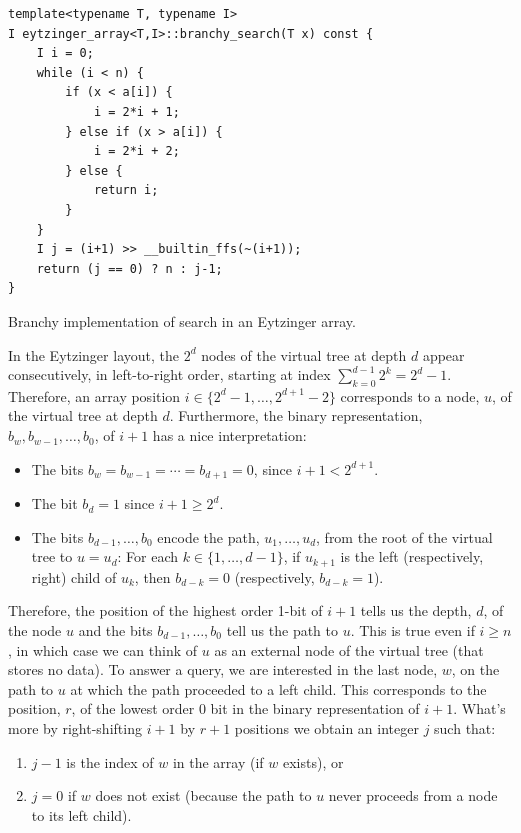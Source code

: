\documentclass{patmorin}
\newcommand{\lstlabel}[1]{\label{lst:#1}}
\begin{document}
\begin{listing}
\begin{verbatim}
template<typename T, typename I>
I eytzinger_array<T,I>::branchy_search(T x) const {
    I i = 0;
    while (i < n) {
        if (x < a[i]) {
            i = 2*i + 1;
        } else if (x > a[i]) {
            i = 2*i + 2;
        } else {
            return i;
        }
    }
    I j = (i+1) >> __builtin_ffs(~(i+1));
    return (j == 0) ? n : j-1;
}
\end{verbatim}
\caption{Branchy implementation of search in an Eytzinger array.}
\lstlabel{eytzinger-i}
\end{listing}

In the Eytzinger layout, the $2^d$ nodes of the virtual tree at depth $d$
appear consecutively, in left-to-right order, starting at index
$\sum_{k=0}^{d-1}2^k = 2^d-1$.  Therefore, an array position
$i\in\{2^d-1,\ldots,2^{d+1}-2\}$ corresponds to a node, $u$, of the
virtual tree at depth $d$. Furthermore, the binary representation,
$b_w,b_{w-1},\ldots,b_0$, of $i+1$ has a nice interpretation:

\begin{itemize}
  \item The bits $b_w=b_{w-1}=\cdots=b_{d+1}=0$, since $i+1 < 2^{d+1}$.
  \item The bit $b_d=1$ since $i+1\ge 2^d$.
  \item The bits $b_{d-1},\ldots,b_{0}$ encode the path,
    $u_1,\ldots,u_{d}$, from the root of the virtual tree to
    $u=u_{d}$: For each $k\in\{1,\ldots,d-1\}$, if $u_{k+1}$ is the left
    (respectively, right) child of $u_k$, then $b_{d-k}=0$ (respectively,
    $b_{d-k}=1$).
\end{itemize}

Therefore, the position of the highest order 1-bit of $i+1$  tells
us the depth, $d$, of the node $u$ and the bits $b_{d-1},\ldots,b_{0}$ tell
us the path to $u$.  This is true even if $i\ge n$, in which case we
can think of $u$ as an external node of the virtual tree (that stores
no data).  To answer a query, we are interested in the last node,
$w$, on the path to $u$ at which the path proceeded to a left child.
This corresponds to the position, $r$, of the lowest order 0 bit in the
binary representation of $i+1$.  What's more by right-shifting $i+1$
by $r+1$ positions we obtain an integer $j$ such that:

\begin{enumerate}
  \item $j-1$ is the index of $w$ in the array (if $w$ exists), or
  \item $j=0$ if $w$ does not exist (because the path to $u$ never proceeds 
        from a node to its left child).
\end{enumerate}
\end{document}
